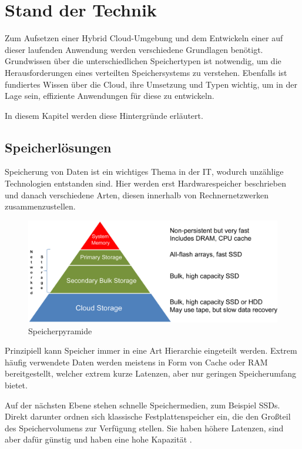 \chapter{Stand der Technik}\label{ch:background}

Zum Aufsetzen einer Hybrid Cloud-Umgebung und dem Entwickeln einer auf dieser laufenden Anwendung werden verschiedene Grundlagen benötigt. Grundwissen über die unterschiedlichen Speichertypen ist notwendig, um die Herausforderungen eines verteilten Speichersystems zu verstehen. Ebenfalls ist fundiertes Wissen über die Cloud, ihre Umsetzung und Typen wichtig, um in der Lage sein, effiziente Anwendungen für diese zu entwickeln.

In diesem Kapitel werden diese Hintergründe erläutert.

\section{Speicherlösungen} \label{sec:storage}
Speicherung von Daten ist ein wichtiges Thema in der IT, wodurch unzählige Technologien entstanden sind. Hier werden erst Hardwarespeicher beschrieben und danach verschiedene Arten, diesen innerhalb von Rechnernetzwerken zusammenzustellen.

\begin{figure}[hbt]
	\centering
	\includegraphics[scale=0.75]{images/storage-pyramide}
	\caption{Speicherpyramide \parencite{kaufmann.2016}}
	\label{fig:storagepyramide}
\end{figure}

Prinzipiell kann Speicher immer in eine Art Hierarchie eingeteilt werden. Extrem häufig verwendete Daten werden meistens in Form von Cache oder RAM bereitgestellt, welcher extrem kurze Latenzen, aber nur geringen Speicherumfang bietet.

Auf der nächsten Ebene stehen schnelle Speichermedien, zum Beispiel SSDs. Direkt darunter ordnen sich klassische Festplattenspeicher ein, die den Großteil des Speichervolumens zur Verfügung stellen. Sie haben höhere Latenzen, sind aber dafür günstig und haben eine hohe Kapazität \parencite[Kap. 2, What is Computer Storage?]{kaufmann.2016}.


